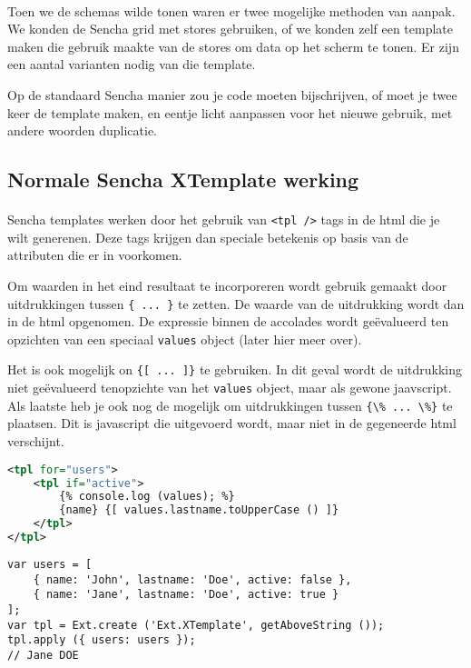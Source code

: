 \paragraph {} Toen we de schemas wilde tonen waren er twee mogelijke methoden van aanpak.
We konden de Sencha grid met stores gebruiken, of we konden zelf een template maken die
gebruik maakte van de stores om data op het scherm te tonen. Er zijn een aantal varianten
nodig van die template.

Op de standaard Sencha manier zou je code moeten bijschrijven, of moet je twee keer de
template maken, en eentje licht aanpassen voor het nieuwe gebruik, met andere woorden
duplicatie.


\subsection {Normale Sencha XTemplate werking}

\paragraph {} Sencha templates werken door het gebruik van \lstinline{<tpl />} tags in de
html die je wilt generenen. Deze tags krijgen dan speciale betekenis op basis van de
attributen die er in voorkomen.

Om waarden in het eind resultaat te incorporeren wordt
gebruik gemaakt door uitdrukkingen tussen \lstinline|{ ... }| te zetten. De waarde van de
uitdrukking wordt dan in de html opgenomen. De expressie binnen de accolades wordt
ge\"evalueerd ten opzichten van een speciaal \lstinline{values} object (later hier meer
over).

Het is ook mogelijk on \lstinline|{[ ... ]}|
te gebruiken. In dit geval wordt de uitdrukking niet ge\"evalueerd tenopzichte van het
\lstinline{values} object, maar als gewone jaavscript. Als laatste heb je ook nog de
mogelijk om uitdrukkingen tussen \lstinline|{\% ... \%}| te plaatsen. Dit is javascript
die uitgevoerd wordt, maar niet in de gegeneerde html verschijnt.

\begin{lstlisting}[language=xml]
<tpl for="users">
	<tpl if="active">
		{% console.log (values); %}
		{name} {[ values.lastname.toUpperCase () ]}
	</tpl>
</tpl>
\end{lstlisting}

\begin{lstlisting}[language=ownjavascript]
var users = [
	{ name: 'John', lastname: 'Doe', active: false },
	{ name: 'Jane', lastname: 'Doe', active: true }
];
var tpl = Ext.create ('Ext.XTemplate', getAboveString ());
tpl.apply ({ users: users });
// Jane DOE
\end{lstlisting}

